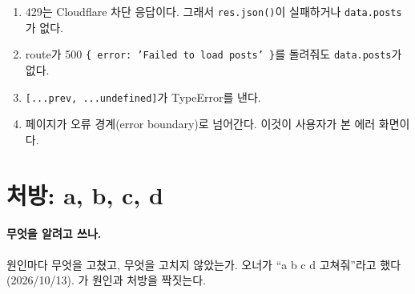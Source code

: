 \begin{enumerate}[nosep]
  \item 429는 Cloudflare 차단 응답이다. 그래서 \texttt{res.json()}이 실패하거나 \texttt{data.posts}가 없다.
  \item route가 500 \texttt{\{ error: 'Failed to load posts' \}}를 돌려줘도 \texttt{data.posts}가 없다.
  \item \texttt{[...prev, ...undefined]}가 TypeError를 낸다.
  \item 페이지가 오류 경계(error boundary)로 넘어간다. 이것이 사용자가 본 에러 화면이다.
\end{enumerate}

\section{처방: a, b, c, d}\label{sec:pf-fix}

\paragraph{무엇을 알려고 쓰나.}
원인마다 무엇을 고쳤고, 무엇을 고치지 않았는가.
오너가 ``a b c d 고쳐줘''라고 했다(2026/10/13).
가 원인과 처방을 짝짓는다.

